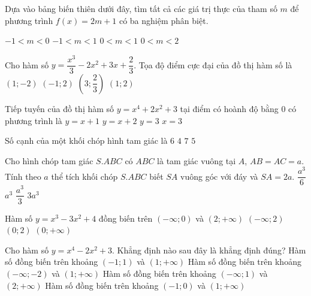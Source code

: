 \begin{ex}%
Dựa vào bảng biến thiên dưới đây, tìm tất cả các giá trị thực của tham số $m$ để phương trình $f(x)=2m+1$ có ba nghiệm phân biệt.
\vspace*{-10pt}
\begin{center}
\immini{}
{
}
\end{center}
\choice
{$-1<m<0$}
{\True $-1<m<1$}
{$0<m<1$}
{$0<m<2$}
\end{ex}

\begin{ex}%
Cho hàm số $y=\dfrac{x^3}{3}-2x^2+3x+\dfrac{2}{3}$. Tọa độ điểm cực đại của đồ thị hàm số là
\choice
{$(1; -2)$}
{$(-1; 2)$}
{$\left(3; \dfrac{2}{3}\right)$}
{\True $(1; 2)$}
\end{ex}

\begin{ex}%
Tiếp tuyến của đồ thị hàm số $y=x^4+2x^2+3$ tại điểm có hoành độ bằng $0$ có phương trình là
\choice
{$y=x+1$}
{$y=x+2$}
{\True $y=3$}
{$x=3$}
\end{ex}

\begin{ex}%
Số cạnh của một khối chóp hình tam giác là
\choice
{\True $6$}
{$4$}
{$7$}
{$5$}
\end{ex}

\begin{ex}%
Cho hình chóp tam giác $S.ABC$ có $ABC$ là tam giác vuông tại $A$, $AB=AC=a$. Tính theo $a$ thể tích khối chóp $S.ABC$ biết $SA$ vuông góc với đáy và $SA=2a$.
\choice
{$\dfrac{a^3}{6}$}
{$a^3$}
{\True $\dfrac{a^3}{3}$}
{$3a^3$}
\end{ex}

\begin{ex}%
Hàm số $y=x^3-3x^2+4$ đồng biến trên
\choice
{\True $(-\infty; 0)$ và $(2; +\infty)$}
{$(-\infty; 2)$}
{$(0; 2)$}
{$(0; +\infty)$}
\end{ex}

\begin{ex}%
Cho hàm số $y=x^4-2x^2+3$. Khẳng định nào sau đây là khẳng định đúng?
\choice
{Hàm số đồng biến trên khoảng $(-1; 1)$ và $(1; +\infty)$}
{Hàm số đồng biến trên khoảng $(-\infty; -2)$ và $(1; +\infty)$}
{Hàm số đồng biến trên khoảng $(-\infty; 1)$ và $(2; +\infty)$}
{\True Hàm số đồng biến trên khoảng $(-1; 0)$ và $(1; +\infty)$}
\end{ex}

